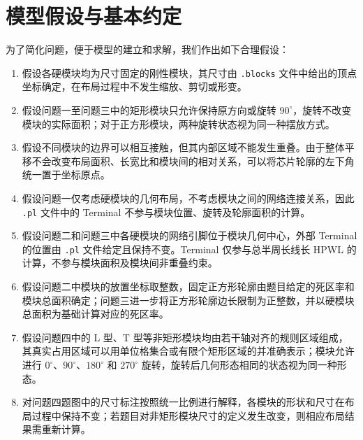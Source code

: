 \section{模型假设与基本约定}

为了简化问题，便于模型的建立和求解，我们作出如下合理假设：

\begin{enumerate}
  \item 假设各硬模块均为尺寸固定的刚性模块，其尺寸由 \texttt{.blocks} 文件中给出的顶点坐标确定，在布局过程中不发生缩放、剪切或形变。
  \item 假设问题一至问题三中的矩形模块只允许保持原方向或旋转 $90^\circ$，旋转不改变模块的实际面积；对于正方形模块，两种旋转状态视为同一种摆放方式。
  \item 假设不同模块的边界可以相互接触，但其内部区域不能发生重叠。由于整体平移不会改变布局面积、长宽比和模块间的相对关系，可以将芯片轮廓的左下角统一置于坐标原点。
  \item 假设问题一仅考虑硬模块的几何布局，不考虑模块之间的网络连接关系，因此 \texttt{.pl} 文件中的 Terminal 不参与模块位置、旋转及轮廓面积的计算。
  \item 假设问题二和问题三中各硬模块的网络引脚位于模块几何中心，外部 Terminal 的位置由 \texttt{.pl} 文件给定且保持不变。Terminal 仅参与总半周长线长 HPWL 的计算，不参与模块面积及模块间非重叠约束。
  \item 假设问题二中模块的放置坐标取整数，固定正方形轮廓由题目给定的死区率和模块总面积确定；问题三进一步将正方形轮廓边长限制为正整数，并以硬模块总面积为基础计算对应的死区率。
  \item 假设问题四中的 L 型、T 型等非矩形模块均由若干轴对齐的规则区域组成，其真实占用区域可以用单位格集合或有限个矩形区域的并准确表示；模块允许进行 $0^\circ$、$90^\circ$、$180^\circ$ 和 $270^\circ$ 旋转，旋转后几何形态相同的状态视为同一种形态。
  \item 对问题四题图中的尺寸标注按照统一比例进行解释，各模块的形状和尺寸在布局过程中保持不变；若题目对非矩形模块尺寸的定义发生改变，则相应布局结果需重新计算。
\end{enumerate}
